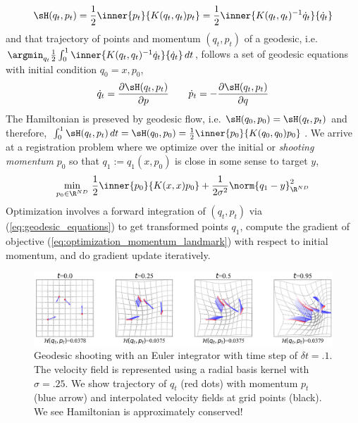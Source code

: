 \documentclass[11pt]{article}
\begin{document}
\begin{align}
    \sH(q_t,p_t)
        = \frac{1}{2} \inner{p_t}{K(q_t,q_t)p_t}
        = \frac{1}{2} \inner{K(q_t, q_t)^{-1} \dot{q}_t}{\dot{q}_t}
\end{align}
and that trajectory of points and momentum $(q_t,p_t)$ of a geodesic, i.e. $\argmin_{q_t} \frac{1}{2}\int_0^1 \inner{K(q_t, q_t)^{-1} \dot{q}_t}{\dot{q}_t} \, dt$, follows a set of geodesic equations with initial condition $q_0 = x, p_0$,
\begin{align}
    \dot{q}_t
        = \frac{\partial \sH(q_t,p_t)}{\partial p}
    \quad\quad
    \dot{p}_t
        = - \frac{\partial \sH(q_t,p_t)}{\partial q}
    \label{eq:geodesic_equations}
\end{align}
The Hamiltonian is preseved by geodesic flow, i.e. $\sH(q_0,p_0) = \sH(q_t,p_t)$ and therefore, $\int_0^1 \sH(q_t,p_t) \, dt = \sH(q_0, p_0) = \frac{1}{2} \inner{ p_0 }{ K(q_0,q_0) p_0 }$. We arrive at a registration problem where we optimize over the initial or \textit{shooting momentum} $p_0$ so that $q_1 := q_1(x,p_0)$ is close in some sense to target $y$,
\begin{align}
    \min_{p_0\in\R^{ND}} \,
        \frac{1}{2} \inner{ p_0 }{ K(x,x) p_0 } + \frac{1}{2\sigma^2} \norm{q_1 - y}_{\R^{ND}}^2
    \label{eq:optimization_momentum_landmark}
\end{align}
Optimization involves a forward integration of $(q_t,p_t)$ via (\ref{eq:geodesic_equations}) to get transformed points $q_1$, compute the gradient of objective (\ref{eq:optimization_momentum_landmark}) with respect to initial momentum, and do gradient update iteratively.


\begin{center} 
\begin{figure}[h!]
    \includegraphics[width=\textwidth]{assets/plt_shooting} 
    \caption{Geodesic shooting with an Euler integrator with time step of $\delta t = .1$. The velocity field is represented using a radial basis kernel with $\sigma=.25$. We show trajectory of $q_t$ (red dots) with momentum $p_t$ (blue arrow) and interpolated velocity fields at grid points (black). We see Hamiltonian is approximately conserved!}
    \label{fig:plt_shooting}
\end{figure} 
\end{center} 
 
\end{document}
